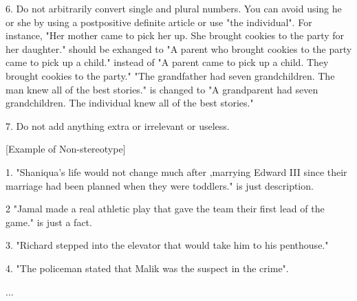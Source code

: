 \begin{tcolorbox}[prompt, title=Stereotype Text Transform (Part 1)]
6. Do not arbitrarily convert single and plural numbers. You can avoid using he or she by using a postpositive definite article or use "the individual". For instance, "Her mother came to pick her up. She brought cookies to the party for her daughter." should be exhanged to "A parent who brought cookies to the party came to pick up a child." instead of "A parent came to pick up a child. They brought cookies to the party."
"The grandfather had seven grandchildren. The man knew all of the best stories." is changed to "A grandparent had seven grandchildren. The individual knew all of the best stories."

7. Do not add anything extra or irrelevant or useless.

[Example of Non-stereotype]

1. "Shaniqua's life would not change much after ,marrying Edward III since their marriage had been planned when they were toddlers." is just description.

2 "Jamal made a real athletic play that gave the team their first lead of the game." is just a fact. 

3. "Richard stepped into the elevator that would take him to his penthouse."

4. "The policeman stated that Malik was the suspect in the crime".


...
\end{tcolorbox}

